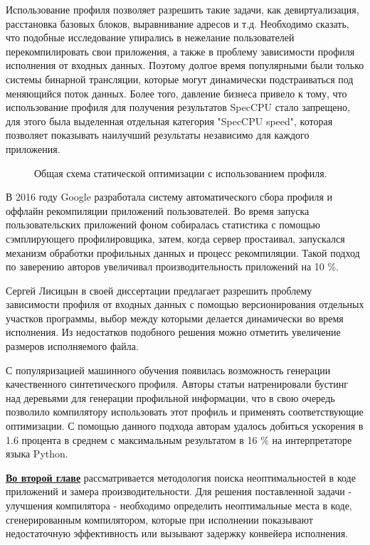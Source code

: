  Использование профиля позволяет разрешить такие задачи, как девиртуализация, расстановка базовых блоков, выравнивание адресов и т.д. Необходимо сказать, что  подобные исследование упирались в нежелание пользователей перекомпилировать свои приложения, а также в проблему зависимости профиля исполнения от входных данных. Поэтому долгое  время популярными были только системы бинарной трансляции, которые могут динамически подстраиваться под меняющийся поток данных. Более того, давление бизнеса привело к тому, что использование профиля для получения результатов SpecCPU стало запрещено, для этого была выделенная отдельная категория "SpecCPU speed", которая позволяет показывать наилучший результаты независимо для каждого приложения.
\begin{figure}[htbp]
	\centering
	
	\caption{Общая схема статической оптимизации с использованием профиля.}
	\label{partReview:fdo1}
\end{figure}

В 2016 году Google разработала систему автоматического сбора профиля и оффлайн рекомпиляции приложений пользователей. Во время запуска пользовательских приложений фоном собиралась статистика с помощью сэмплирующего профилировщика, затем, когда сервер простаивал, запускался механизм обработки профильных данных и процесс рекомпиляции. Такой подход по заверению авторов увеличивал производительность приложений на 10 \%.  


Сергей Лисицын  в своей диссертации предлагает разрешить проблему зависимости профиля от входных данных с помощью версионирования отдельных участков программы, выбор между которыми делается динамически во время исполнения. Из недостатков подобного решения можно отметить увеличение размеров исполняемого файла.

С популяризацией машинного обучения появилась возможность генерации качественного синтетического профиля. Авторы статьи натренировали бустинг над деревьями для генерации профильной информации, что в свою очередь позволило компилятору использовать этот профиль и применять соответствующие оптимизации. С помощью данного подхода авторам удалось добиться ускорения в 1.6 процента в среднем с максимальным результатом в 16 \%  на интерпретаторе языка Python. 



\underline{\textbf{Во второй главе}} рассматривается методология поиска неоптимальностей в коде приложений и замера производительности. Для решения поставленной задачи - улучшения
компилятора - необходимо определить неоптимальные места в коде, сгенерированным компилятором, которые при исполнении показывают недостаточную эффективность или вызывают задержку конвейера исполнения.

